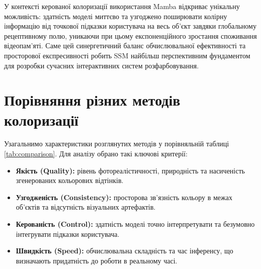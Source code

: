             У контексті керованої колоризації використання Mamba відкриває унікальну можливість:
            здатність моделі миттєво та узгоджено поширювати колірну інформацію від точкової підказки користувача на весь об'єкт завдяки глобальному рецептивному полю,
            уникаючи при цьому експоненційного зростання споживання відеопам'яті.
            Саме цей синергетичний баланс обчислювальної ефективності та просторової експресивності робить SSM найбільш перспективним фундаментом для розробки сучасних інтерактивних систем розфарбовування.

    \section{Порівняння різних методів колоризації}
        Узагальнимо характеристики розглянутих методів у порівняльній таблиці \ref{tab:comparison}.
        Для аналізу обрано такі ключові критерії:
        \begin{itemize}[label=$\bullet$]
            \item \textbf{Якість (Quality):} рівень фотореалістичності, природність та насиченість згенерованих кольорових відтінків.
            \item \textbf{Узгодженість (Consistency):} просторова зв'язність кольору в межах об'єктів та відсутність візуальних артефактів.
            \item \textbf{Керованість (Control):} здатність моделі точно інтерпретувати та безумовно інтегрувати підказки користувача.
            \item \textbf{Швидкість (Speed):} обчислювальна складність та час інференсу, що визначають придатність до роботи в реальному часі.
        \end{itemize}

